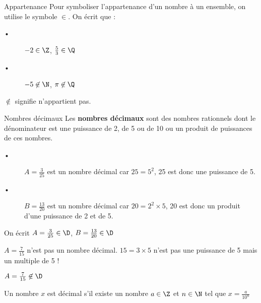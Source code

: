 
\begin{DefT}{Appartenance}
Pour symboliser l'appartenance d'un nombre à un ensemble, on utilise le symbole $\in$. On écrit que :
\begin{description}
\item[•] $-2 \in \Z$, $\frac{5}{3} \in \Q$
\item[•] $-5 \not \in \N$, $\pi \not\in \Q$
\end{description}
\end{DefT}

\begin{Nt}
 $ \not\in$ signifie n'appartient pas.
\end{Nt}



\begin{DefT}{Nombres décimaux}
Les \textbf{nombres décimaux} sont des nombres rationnels dont le dénominateur est une puissance de 2, de 5 ou de 10 ou un produit de puissances de ces nombres.
\end{DefT}

\begin{Ex}
\begin{description}
\item[•] $A=\frac{3}{25}$ est un nombre décimal car $25 = 5^2$, 25 est donc une puissance de 5.
\item[•] $B=\frac{13}{20}$ est un nombre décimal car $20 = 2^2 \times 5$, 20 est donc un produit d'une puissance de 2 et de 5.
\end{description}
On écrit $A=\frac{3}{25} \in \D$, $B=\frac{13}{20} \in \D$
\end{Ex}



\begin{Att}
$A=\frac{7}{15}$ n'est pas un nombre décimal. $15=3 \times 5$ n'est pas une puissance de 5 mais un multiple de 5 !

$A=\frac{7}{15} \not \in \D$
\end{Att}

  
\begin{Log}
Un nombre $x$ est décimal s'il existe un nombre $a \in \Z$ et $n \in \N$ tel que $x = \frac{a}{10^n}$
\end{Log}


 
\begin{minipage}{0.47\linewidth}

\end{minipage}
\hfill
\begin{minipage}{0.47\linewidth}

\end{minipage}

